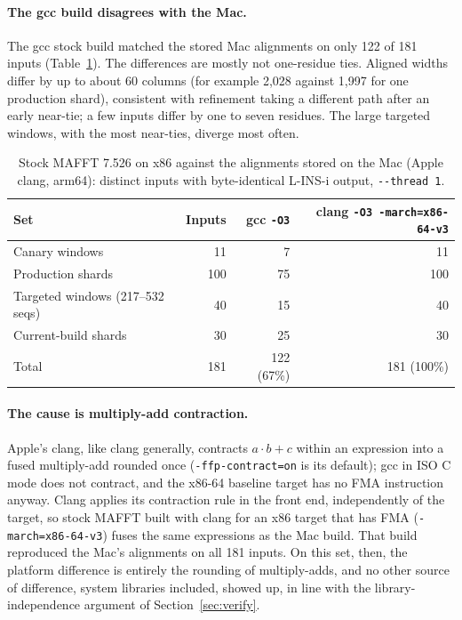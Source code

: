 \documentclass[11pt]{article}
\newcommand{\code}[1]{\texttt{#1}}
\begin{document}
\paragraph{The gcc build disagrees with the Mac.} The gcc stock build matched the stored Mac
alignments on only 122 of 181 inputs (Table~\ref{tab:xplat}). The differences are mostly not
one-residue ties. Aligned widths differ by up to about 60 columns (for example 2{,}028
against 1{,}997 for one production shard), consistent with refinement taking a different path
after an early near-tie; a few inputs differ by one to seven residues. The large targeted
windows, with the most near-ties, diverge most often.

\begin{table}[h]
\centering
\caption{Stock MAFFT 7.526 on x86 against the alignments stored on the Mac (Apple clang,
arm64): distinct inputs with byte-identical L-INS-i output, \code{-{}-thread 1}.}
\label{tab:xplat}
\begin{tabular}{lrrr}
\toprule
Set & Inputs & gcc \code{-O3} & clang \code{-O3 -march=x86-64-v3} \\
\midrule
Canary windows & 11 & 7 & 11 \\
Production shards & 100 & 75 & 100 \\
Targeted windows (217--532 seqs) & 40 & 15 & 40 \\
Current-build shards & 30 & 25 & 30 \\
\midrule
Total & 181 & 122 (67\%) & 181 (100\%) \\
\bottomrule
\end{tabular}
\end{table}

\paragraph{The cause is multiply-add contraction.} Apple's clang, like clang generally,
contracts $a\cdot b + c$ within an expression into a fused multiply-add rounded once
(\code{-ffp-contract=on} is its default); gcc in ISO C mode does not contract, and the x86-64
baseline target has no FMA instruction anyway. Clang applies its contraction rule in the front
end, independently of the target, so stock MAFFT built with clang for an x86 target that has
FMA (\code{-march=x86-64-v3}) fuses the same expressions as the Mac build. That build
reproduced the Mac's alignments on all 181 inputs. On this set, then, the platform difference
is entirely the rounding of multiply-adds, and no other source of difference, system
libraries included, showed up, in line with the library-independence argument of
Section~\ref{sec:verify}.
\end{document}
